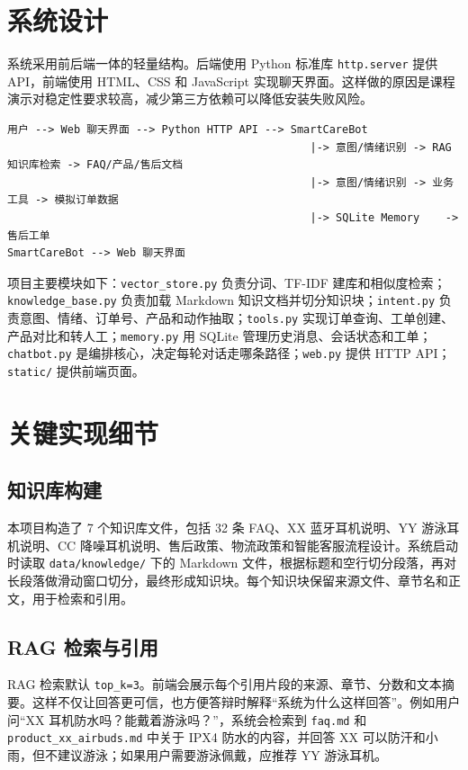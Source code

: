\documentclass[12pt,a4paper]{ctexart}
\begin{document}
\section{系统设计}

系统采用前后端一体的轻量结构。后端使用 Python 标准库 \texttt{http.server} 提供 API，前端使用 HTML、CSS 和 JavaScript 实现聊天界面。这样做的原因是课程演示对稳定性要求较高，减少第三方依赖可以降低安装失败风险。

\begin{verbatim}
用户 --> Web 聊天界面 --> Python HTTP API --> SmartCareBot
                                               |-> 意图/情绪识别 -> RAG 知识库检索 -> FAQ/产品/售后文档
                                               |-> 意图/情绪识别 -> 业务工具 -> 模拟订单数据
                                               |-> SQLite Memory    -> 售后工单
SmartCareBot --> Web 聊天界面
\end{verbatim}

项目主要模块如下：\texttt{vector\_store.py} 负责分词、TF-IDF 建库和相似度检索；\texttt{knowledge\_base.py} 负责加载 Markdown 知识文档并切分知识块；\texttt{intent.py} 负责意图、情绪、订单号、产品和动作抽取；\texttt{tools.py} 实现订单查询、工单创建、产品对比和转人工；\texttt{memory.py} 用 SQLite 管理历史消息、会话状态和工单；\texttt{chatbot.py} 是编排核心，决定每轮对话走哪条路径；\texttt{web.py} 提供 HTTP API；\texttt{static/} 提供前端页面。

\section{关键实现细节}

\subsection{知识库构建}

本项目构造了 7 个知识库文件，包括 32 条 FAQ、XX 蓝牙耳机说明、YY 游泳耳机说明、CC 降噪耳机说明、售后政策、物流政策和智能客服流程设计。系统启动时读取 \texttt{data/knowledge/} 下的 Markdown 文件，根据标题和空行切分段落，再对长段落做滑动窗口切分，最终形成知识块。每个知识块保留来源文件、章节名和正文，用于检索和引用。

\subsection{RAG 检索与引用}

RAG 检索默认 \texttt{top\_k=3}。前端会展示每个引用片段的来源、章节、分数和文本摘要。这样不仅让回答更可信，也方便答辩时解释“系统为什么这样回答”。例如用户问“XX 耳机防水吗？能戴着游泳吗？”，系统会检索到 \texttt{faq.md} 和 \texttt{product\_xx\_airbuds.md} 中关于 IPX4 防水的内容，并回答 XX 可以防汗和小雨，但不建议游泳；如果用户需要游泳佩戴，应推荐 YY 游泳耳机。
\end{document}
